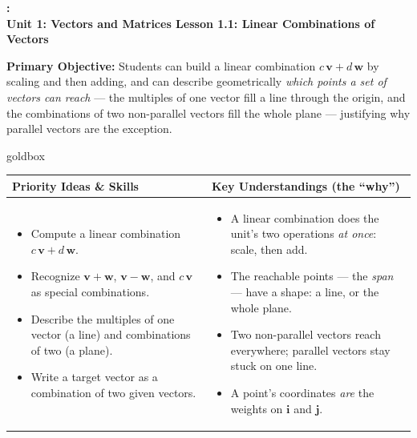 \documentclass[10pt]{article}
\newcommand{\vv}{\mathbf{v}}
\newcommand{\ww}{\mathbf{w}}
\newcommand{\UnitNumberName}{Unit 1: Vectors and Matrices \quad}
\newcommand{\LessonNumberName}{Lesson 1.1: Linear Combinations of Vectors}
\begin{document}
\begin{center}
    {\Large\bfseries \CourseName: \SchoolYear \\
    {\small\bfseries \UnitNumberName \LessonNumberName}}
\end{center}

\begin{tcolorbox}[colback=blush, colframe=burgundy, boxrule=0.9pt, arc=2mm,
    left=2mm, right=2mm, top=1.5mm, bottom=1.5mm]
    \textbf{Primary Objective:} Students can build a linear combination $c\,\vv + d\,\ww$ by
    scaling and then adding, and can describe geometrically \emph{which points a set of
    vectors can reach} --- the multiples of one vector fill a line through the origin, and the
    combinations of two non-parallel vectors fill the whole plane --- justifying why parallel
    vectors are the exception.
\end{tcolorbox}

\renewcommand{\arraystretch}{1.4}
\begin{skillbox}{goldbox}
\begin{tabularx}{\linewidth}{@{}X|X@{}}
\textbf{Priority Ideas \& Skills} & \textbf{Key Understandings (the ``why'')} \\[2pt]
\hline
\vspace{-6pt}
\begin{itemize}[leftmargin=1.1em, nosep, after=\vspace{2pt}]
  \item Compute a linear combination $c\,\vv+d\,\ww$.
  \item Recognize $\vv+\ww$, $\vv-\ww$, and $c\,\vv$ as special combinations.
  \item Describe the multiples of one vector (a line) and combinations of two (a plane).
  \item Write a target vector as a combination of two given vectors.
\end{itemize}
&
\vspace{-6pt}
\begin{itemize}[leftmargin=1.1em, nosep, after=\vspace{2pt}]
  \item A linear combination does the unit's two operations \emph{at once}: scale, then add.
  \item The reachable points --- the \emph{span} --- have a shape: a line, or the whole plane.
  \item Two non-parallel vectors reach everywhere; parallel vectors stay stuck on one line.
  \item A point's coordinates \emph{are} the weights on $\mathbf{i}$ and $\mathbf{j}$.
\end{itemize}
\end{tabularx}
\end{skillbox}
\end{document}
